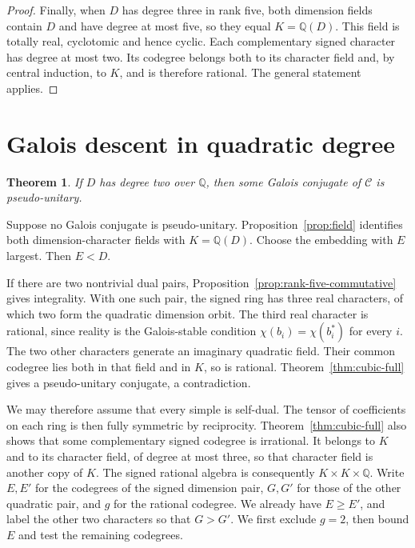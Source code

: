 \documentclass[11pt,a4paper]{article}
\newtheorem{theorem}{Theorem}[section]
\numberwithin{equation}{section}
\begin{document}
\begin{proof}
Finally, when $D$ has degree three in rank five, both dimension fields
contain $D$ and have degree at most five, so they equal $K=\mathbb Q(D)$.
This field is totally real, cyclotomic and hence cyclic. Each
complementary signed character has degree at most two. Its codegree
belongs both to its character field and, by central induction, to
$K$, and is therefore rational. The general statement applies.
\end{proof}



\section{Galois descent in quadratic degree}\label{sec:quadratic}
\begin{theorem}\label{thm:quadratic-full}
If $D$ has degree two over $\mathbb Q$, then some Galois conjugate of
$\mathcal C$ is pseudo-unitary.
\end{theorem}
Suppose no Galois conjugate is pseudo-unitary.
Proposition~\ref{prop:field} identifies both dimension-character fields
with $K=\mathbb Q(D)$. Choose the embedding with $E$ largest.
Then $E<D$.

If there are two nontrivial dual pairs, Proposition~\ref{prop:rank-five-commutative} gives integrality. With one such pair, the signed ring has three real characters, of which two form the quadratic dimension orbit. The third real character is rational, since reality is the Galois-stable condition $\chi(b_i)=\chi(b_i^*)$ for every $i$. The two other characters generate an imaginary quadratic field. Their common codegree lies both in that field and in $K$, so is rational. Theorem~\ref{thm:cubic-full} gives a pseudo-unitary conjugate, a
contradiction.

We may therefore assume that every simple is self-dual. The tensor of coefficients on each ring is then fully symmetric by reciprocity. Theorem~\ref{thm:cubic-full} also shows that some complementary signed codegree is irrational. It belongs to $K$ and to its character field, of degree at most three, so that character field is another copy of $K$. The signed rational algebra is consequently $K\times K\times\mathbb Q$. Write $E,E'$ for the codegrees of the signed dimension pair, $G,G'$ for those of the other quadratic pair, and $g$ for the rational codegree. We already have $E\ge E'$, and label the other two characters so that
$G>G'$. We first exclude $g=2$, then bound $E$ and test the remaining codegrees.
\end{document}
